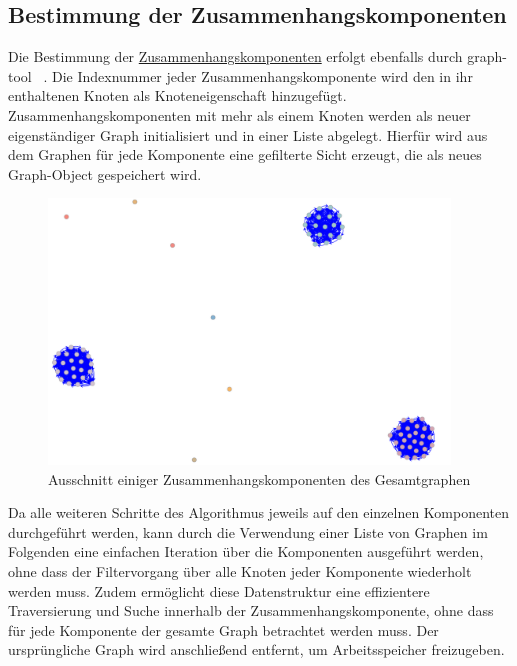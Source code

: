 \subsection{Bestimmung der Zusammenhangskomponenten} \label{subsec:comp}

Die Bestimmung der \hyperref[schritt5]{Zusammenhangskomponenten\label{schritt5txt}} erfolgt ebenfalls durch graph-tool ~\cite{docs_graph_tool}. Die Indexnummer jeder Zusammenhangskomponente wird den in ihr enthaltenen Knoten als Knoteneigenschaft hinzugefügt. Zusammenhangskomponenten mit mehr als einem Knoten  werden als neuer eigenständiger Graph initialisiert und in einer Liste abgelegt. Hierfür wird aus dem Graphen für jede Komponente eine gefilterte Sicht erzeugt, die als neues Graph-Object gespeichert wird. \\

\begin{figure}[H]
	\begin{center}
		\includegraphics[width=0.95\textwidth]{bilder/all_components_5.png}
		\caption{Ausschnitt einiger Zusammenhangskomponenten des Gesamtgraphen }
		\label{fig:all_comp} 
	\end{center}
\end{figure}

Da alle weiteren Schritte des Algorithmus jeweils auf den einzelnen Komponenten durchgeführt werden, kann durch die Verwendung einer Liste von Graphen im Folgenden eine einfachen Iteration über die Komponenten ausgeführt werden, ohne dass der Filtervorgang über alle Knoten jeder Komponente wiederholt werden muss. Zudem ermöglicht diese Datenstruktur eine effizientere Traversierung und Suche innerhalb der Zusammenhangskomponente, ohne dass für jede Komponente der gesamte Graph betrachtet werden muss. Der ursprüngliche Graph wird anschließend entfernt, um Arbeitsspeicher freizugeben. \\

